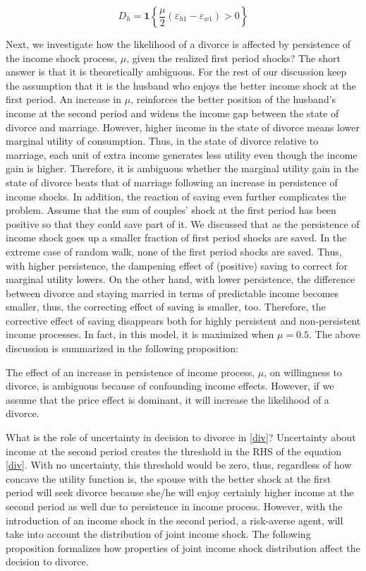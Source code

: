 \begin{equation*}
D_h = \mathbf 1 \left \{ \dfrac{\mu}{2} (\varepsilon_{h1} - \varepsilon_{w1}) > 0\right\}
\end{equation*}

Next, we investigate how the likelihood of a divorce is affected by persistence of the income shock process, $\mu$, given the realized first period shocks? The short answer is that it is theoretically ambiguous. For the rest of our discussion keep the assumption that it is the husband who enjoys the better income shock at the first period. An increase in $\mu$, reinforces the better position of the husband's income at the second period and widens the income gap between the state of divorce and marriage. However, higher income in the state of divorce means lower marginal utility of consumption. Thus, in the state of divorce relative to marriage, each unit of extra income generates less utility even though the income gain is higher. Therefore, it is ambiguous whether the marginal utility gain in the state of divorce beats that of marriage following an increase in persistence of income shocks. In addition, the reaction of saving even further complicates the problem. Assume that the sum of couples' shock at the first period has been positive so that they could save part of it. We discussed that as the persistence of income shock goes up a smaller fraction of first period shocks are saved. In the extreme case of random walk, none of the first period shocks are saved. Thus, with higher persistence, the dampening effect of (positive) saving to correct for marginal utility lowers. On the other hand, with lower persistence, the difference between divorce and staying married in terms of predictable income becomes smaller, thus, the correcting effect of saving is smaller, too. Therefore, the corrective effect of saving disappears both for highly persistent and non-persistent income processes. In fact, in this model, it is maximized when $\mu = 0.5$. The above discussion is summarized in the following proposition:

\begin{prop}
The effect of an increase in persistence of income process, $\mu$, on willingness to divorce, is ambiguous because of confounding income effects. However, if we assume that the price effect is dominant, it will increase the likelihood of a divorce. 
\end{prop}

 
What is the role of uncertainty in decision to divorce in \eqref{div}? Uncertainty about income at the second period creates the threshold in the RHS of the equation \eqref{div}. With no uncertainty, this threshold would be zero, thus, regardless of how concave the utility function is, the spouse with the better shock at the first period will seek divorce because she/he  will enjoy certainly higher income at the second period as well due to persistence in income process.  However, with the introduction of an income shock in the second period, a risk-averse agent, will take into account the distribution of joint income shock. The following proposition formalizes how properties of joint income shock distribution affect the decision to divorce. 

